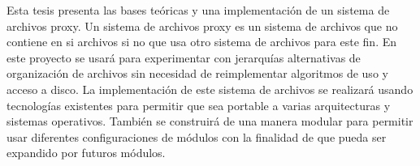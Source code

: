 


\begin{summary}        %

Esta tesis presenta las bases teóricas y una implementación de un sistema de archivos proxy. Un sistema de archivos proxy es un sistema de archivos que no contiene en si archivos si no que usa otro sistema de archivos para este fin. En este proyecto se usará para experimentar con jerarquías alternativas de organización de archivos sin necesidad de reimplementar algoritmos de uso y acceso a disco. La implementación de este sistema de archivos se realizará usando tecnologías existentes para permitir que sea portable a varias arquitecturas y sistemas operativos. También se construirá de una manera modular para permitir usar diferentes configuraciones de módulos con la finalidad de que pueda ser expandido por futuros módulos.

\end{summary}




